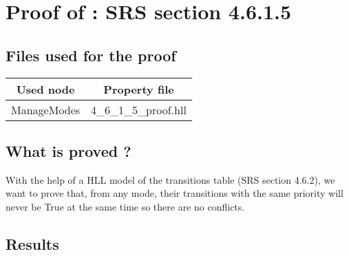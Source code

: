\section{Proof of : SRS section 4.6.1.5}
\subsection{Files used for the proof}
\begin{tabular}{|c|c|}
\hline
Used node & Property file \\ \hline
ManageModes & 4\_6\_1\_5\_proof.hll \\
\hline
\end{tabular}

\subsection{What is proved ?}
With the help of a HLL model of the transitions table (SRS section
4.6.2), we want to prove that, from any mode, their transitions with
the same priority will never be True at the same time so there are no
conflicts.




\subsection{Results}
